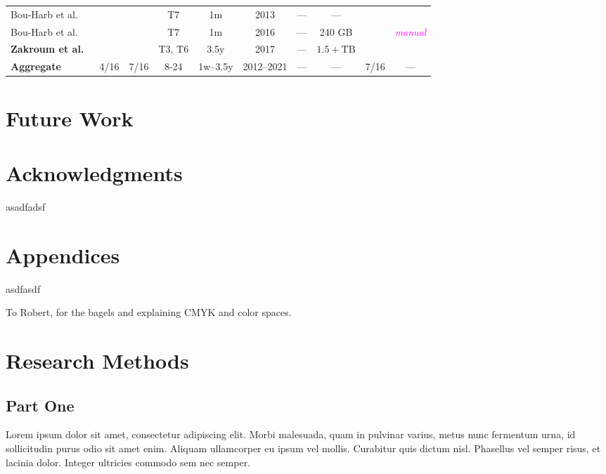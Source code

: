 \documentclass[manuscript,nonacm]{acmart}
\newcommand{\cmark}{\ding{51}}%
\newcommand{\xmark}{\ding{55}}%
\newcommand{\wc}[1]{\textit{\textcolor{magenta}{#1}}} %
\begin{document}
\begin{table*}[h!]
\begin{tabular}{@{}lccccccccc@{}}
		Bou-Harb et al.~\cite{2014bouharb}                     
		& \xmark & \xmark           
		& T7         
		& 1m    & 2013    
		& ---                  
		& ---              
		& \xmark            
		& \xmark          \\
		
		Bou-Harb et al.~\cite{2019bouharb,2015bouharb}         
		& \xmark & \cmark           
		& T7     
		& 1m    & 2016    
		& ---                  
		& 240 GB        
		& \cmark            
		& \wc{manual}    \\
		
		\textbf{Zakroum et al.~\cite{2022zakroum,2018zakroum}} 
		& \xmark & \cmark           
		& T3, T6    
		& 3.5y  & 2017    
		& ---                  
		& $1.5+\mathrm{TB}$ 
		& \cmark            
		& \xmark          \\
		
		\midrule
		\textbf{Aggregate}         
		& 4/16 & 7/16  & 8-24                  
		& 1w--3.5y & 2012--2021 
		& ---                  
		& ---              
		& 7/16          
		& ---              
		\\
		\bottomrule
	\end{tabular}
\end{table*}

\label{sec:fw}
\section{Future Work}

\section{Acknowledgments}
asadfadsf

\section{Appendices}

asdfasdf

\begin{acks}
To Robert, for the bagels and explaining CMYK and color spaces.
\end{acks}




\appendix
\section{Research Methods}

\subsection{Part One}

Lorem ipsum dolor sit amet, consectetur adipiscing elit. Morbi
malesuada, quam in pulvinar varius, metus nunc fermentum urna, id
sollicitudin purus odio sit amet enim. Aliquam ullamcorper eu ipsum
vel mollis. Curabitur quis dictum nisl. Phasellus vel semper risus, et
lacinia dolor. Integer ultricies commodo sem nec semper.
\end{document}
